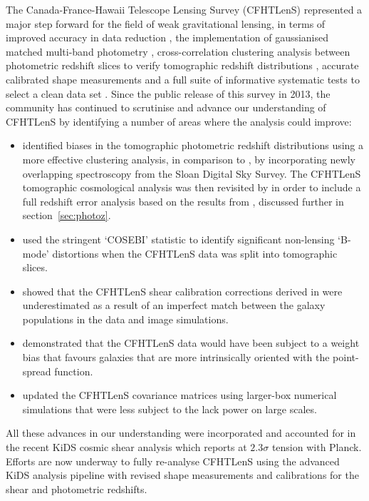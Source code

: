 The Canada-France-Hawaii Telescope Lensing Survey (CFHTLenS) represented a major step forward for the field of weak gravitational lensing, in terms of improved accuracy in data reduction \citep{erben/etal:2013}, the implementation of gaussianised matched multi-band photometry \citep{hildebrandt/etal:2012}, cross-correlation clustering analysis between photometric redshift slices to verify tomographic redshift distributions \citep{benjamin/etal:2013}, accurate calibrated shape measurements \citep{miller/etal:2013} and a full suite of informative systematic tests to select a clean data set \citep{heymans/etal:2012}.    Since the public release of this survey in 2013, the community has continued to scrutinise and advance our understanding of CFHTLenS by identifying a number of areas where the analysis could improve:
\begin{itemize}
\item{\citet{choi/etal:2016} identified biases in the tomographic photometric redshift distributions using a more effective clustering analysis, in comparison to \citet{benjamin/etal:2013}, by incorporating newly overlapping spectroscopy from the Sloan Digital Sky Survey.  The CFHTLenS tomographic cosmological analysis was then revisited by \citet{joudaki/etal:2016} in order to include a full redshift error analysis based on the results from \citet{choi/etal:2016}, discussed further in section~\ref{sec:photoz}.}
\item{\citet{asgari/etal:2016} used the stringent `COSEBI' statistic to identify significant non-lensing `B-mode' distortions when the CFHTLenS data was split into tomographic slices.}
\item{\citet{kuijken/etal:2015} showed that the CFHTLenS shear calibration corrections derived in \citet{miller/etal:2013} were underestimated as a result of an imperfect match between the galaxy populations in the data and image simulations.}
\item{\citet{fenechconti/etal:2016} demonstrated that the CFHTLenS data would have been subject to a weight bias that favours galaxies that are more intrinsically oriented with the point-spread function.}
\item{\citet{joudaki/etal:2016} updated the CFHTLenS covariance matrices using larger-box numerical simulations that were less subject to the lack power on large scales.}
\end{itemize}
All these advances in our understanding were incorporated and accounted for in the recent KiDS cosmic shear analysis \citep{hildebrandt/etal:2016} which reports at $2.3 \sigma$ tension with Planck.  Efforts are now underway to fully re-analyse CFHTLenS using the advanced KiDS analysis pipeline with revised shape measurements and calibrations for the shear and photometric redshifts.  

